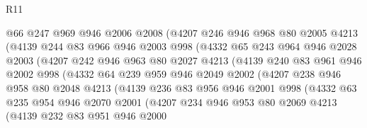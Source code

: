 \begin{lexlean}{R11}
\begin{coremodule}
                @66
                @247
                @969
                @946
                @2006
                @2008
                (@4207
                  @246
                  @946
                  @968
                  @80
                  @2005
                  @4213
                  (@4139
                    @244
                    @83
                    @966
                    @946
                    @2003
                    @998
                    (@4332
                      @65
                      @243
                      @964
                      @946
                      @2028
                      @2003
                      (@4207
                        @242
                        @946
                        @963
                        @80
                        @2027
                        @4213
                        (@4139
                          @240
                          @83
                          @961
                          @946
                          @2002
                          @998
                          (@4332
                            @64
                            @239
                            @959
                            @946
                            @2049
                            @2002
                            (@4207
                              @238
                              @946
                              @958
                              @80
                              @2048
                              @4213
                              (@4139
                                @236
                                @83
                                @956
                                @946
                                @2001
                                @998
                                (@4332
                                  @63
                                  @235
                                  @954
                                  @946
                                  @2070
                                  @2001
                                  (@4207
                                    @234
                                    @946
                                    @953
                                    @80
                                    @2069
                                    @4213
                                    (@4139
                                      @232
                                      @83
                                      @951
                                      @946
                                      @2000

\end{coremodule}
\end{lexlean}
